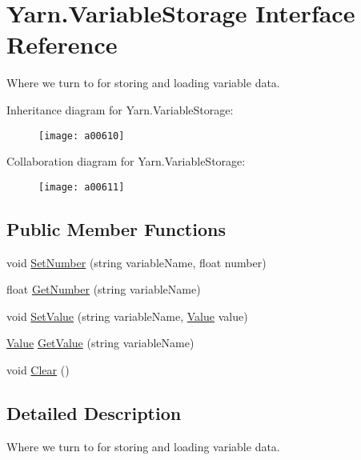 \hypertarget{a00192}{\section{Yarn.\-Variable\-Storage Interface Reference}
\label{a00192}
}


Where we turn to for storing and loading variable data.  




Inheritance diagram for Yarn.\-Variable\-Storage\-:
\nopagebreak
\begin{figure}[H]
\begin{center}
\leavevmode
\texttt{[image: a00610]}
\end{center}
\end{figure}


Collaboration diagram for Yarn.\-Variable\-Storage\-:
\nopagebreak
\begin{figure}[H]
\begin{center}
\leavevmode
\texttt{[image: a00611]}
\end{center}
\end{figure}
\subsection*{Public Member Functions}
\begin{DoxyCompactItemize}
\item 
void \hyperlink{a00192_aa28c3694f985cf73489efc301b9d41dd}{Set\-Number} (string variable\-Name, float number)
\item 
float \hyperlink{a00192_a04b061c52d8ac814ce559da5286fbc71}{Get\-Number} (string variable\-Name)
\item 
void \hyperlink{a00192_aa90ff61224432c5ed3ce72199c55f440}{Set\-Value} (string variable\-Name, \hyperlink{a00189}{Value} value)
\item 
\hyperlink{a00189}{Value} \hyperlink{a00192_accab1fc5c8fc353dbfc53ca0f4029576}{Get\-Value} (string variable\-Name)
\item 
void \hyperlink{a00192_af98c1e41f351cb96e13f668ca2fd9d92}{Clear} ()
\end{DoxyCompactItemize}


\subsection{Detailed Description}
Where we turn to for storing and loading variable data. 


